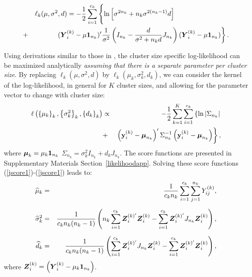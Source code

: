 \documentclass[11pt,a5paper,twoside]{book}
\newcommand{\BY}{\mbox{\boldmath $Y$}}
\newcommand{\BZ}{\mbox{\boldmath $Z$}}
\newcommand{\by}{{\bf y}}
\newcommand{\bmu}{\mbox{\boldmath $\mu$}}
\begin{document}
\begin{equation}
\label{loglikcsk}
\begin{aligned}
&&\ell_k(\mu,\sigma^2,d)=
-\frac{1}{2}\sum_{i=1}^{c_k}
\left\{\ln
\left[\sigma^{2n_k}+n_k\sigma^{2(n_k-1)}d\right]\phantom{\frac{d_m}{\sigma_m^2+nd_m}}
\phantom{-\frac{1}{2}\sum_{i=1}^N} \right.\\
&+&\left.(\BY_{i}^{(k)}-\mu\mathbf{1}_{n_k})'\frac{1}{\sigma^2}\left(I_{n_k}-\frac{d}{\sigma^2+n_kd}J_{n_k}\right)(\BY_{i}^{(k)}-\mu\mathbf{1}_{n_k})\right\}.
\end{aligned}
\end{equation}


Using derivations similar to those in \cite{Iddi2011}, the cluster size specific log-likelihood can be maximized analytically {\em assuming that there is a separate parameter per cluster size}. By replacing $\ell_k(\mu,\sigma^2,d)$ by
$\ell_k(\mu_k,\sigma^2_k,d_k)$, we can consider the kernel of the log-likelihood, in general for $K$ cluster sizes, and allowing for the parameter vector to change with cluster size:
\begin{equation}
   \label{jloglik}
\begin{aligned}
\ell\left(\left\{\mu_k\right\}_k,\left\{\sigma_k^2\right\}_k,\left\{d_k\right\}_k\right)  &\propto& - \frac{1}{2}\sum_{k=1}^K\sum_{i=1}^{c_k} \left\{\ln|\Sigma_{n_k}| \right. \\ 
&+& \left. \left(\by_{i}^{(k)}-\bmu_{n_k}\right)'\Sigma_{n_k}^{-1} \left(\by_{i}^{(k)}-\bmu_{n_k}\right) \right\},
\end{aligned}
\end{equation}
where $\bmu_k=\mu_k\mathbf{1}_{n_k}$  $\Sigma_{n_k}=\sigma_k^2 I_{n_k}+ d_k J_{n_k}$. The score functions are presented in Supplementary Materials Section~\ref{likelihoodapp}.
Solving these score functions (\ref{jscore1})-(\ref{jscore1})
leads to:
\begin{eqnarray}
\label{muk}
\widehat{\mu}_k&=&\frac{1}{c_kn_k}\sum_{i=1}^{c_k}\sum_{j=1}^{n_k}Y_{ij}^{(k)},\\[2mm]
\widehat{\sigma}^2_k&=&\frac{1}{c_kn_k(n_k-1)}\left(
n_k\sum_{i=1}^{c_k}\BZ_{i}^{(k)'}\BZ_{i}^{(k)}-\sum_{i=1}^{c_k}\BZ_{i}^{(k)'}J_{n_k}\BZ_{i}^{(k)}
\right),\label{sigmak}\\[2mm]
\widehat{d}_k&=&
\frac{1}{c_kn_k(n_k-1)}\left(
\sum_{i=1}^{c_k}\BZ_{i}^{(k)'}J_{n_k}\BZ_{i}^{(k)}-\sum_{i=1}^{c_k}\BZ_{i}^{(k)'}\BZ_{i}^{(k)}
\right),\label{dk}
\end{eqnarray}
where $\BZ_{i}^{(k)}=\left(\BY_{i}^{(k)}-\mu_k\mathbf{1}_{n_k}\right)$.
\end{document}
